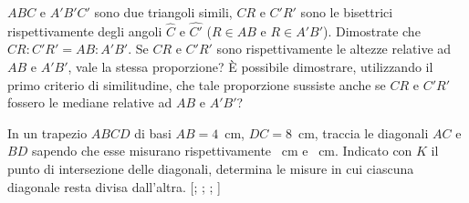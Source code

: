\begin{multicols}{2}
\begin{esercizio}
\label{ese:6.63}
$ABC$ e $A'B'C'$ sono due triangoli simili, $CR$ e $C'R'$ sono le bisettrici rispettivamente degli angoli $\widehat{C}$ e $\widehat{C'}$ ($R\in AB$ e $R\in A'B'$). Dimostrate che $CR : C'R' = AB : A'B'$. Se $CR$ e $C'R'$ sono rispettivamente le altezze relative ad $AB$ e $A'B'$, vale la stessa proporzione? \`E possibile dimostrare, utilizzando il primo criterio di similitudine, che tale proporzione sussiste anche se $CR$ e $C'R'$ fossero le mediane relative ad $AB$ e $A'B'$?
\end{esercizio}

\begin{esercizio}
\label{ese:6.64}
In un trapezio $ABCD$ di basi $AB=4$~cm, $DC=8$~cm, traccia le diagonali $AC$ e $BD$ sapendo che esse misurano rispettivamente ~cm e ~cm. Indicato con $K$ il punto di intersezione delle diagonali, determina le misure in cui ciascuna diagonale resta divisa dall'altra. [; ; ; ]
\end{esercizio}

\end{multicols}
